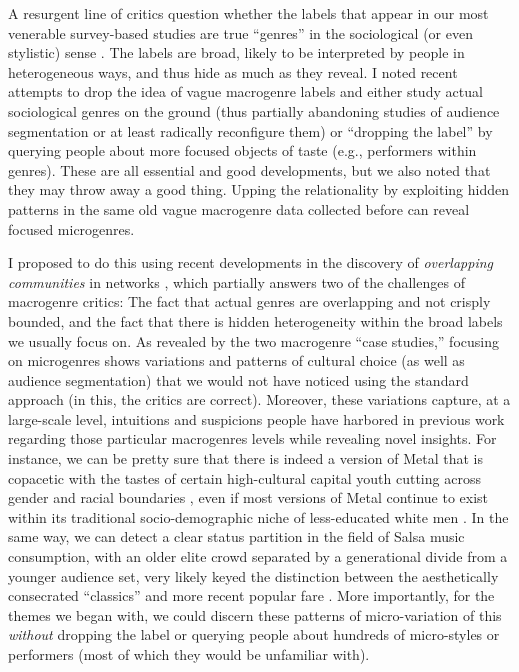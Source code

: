 \documentclass[a4paper,12pt]{article}
\begin{document}
A resurgent line of critics question whether the labels that appear in our most venerable survey-based studies are true ``genres'' in the sociological (or even stylistic) sense \citep{lena2015relational, vlegels2015music}. The labels are broad, likely to be interpreted by people in heterogeneous ways, and thus hide as much as they reveal. I noted recent attempts to drop the idea of vague macrogenre labels and either study actual sociological genres on the ground (thus partially abandoning studies of audience segmentation or at least radically reconfigure them) or ``dropping the label'' \citep{sonnett2016ambivalence} by querying people about more focused objects of taste (e.g., performers within genres). These are all essential and good developments, but we also noted that they may throw away a good thing. Upping the relationality by exploiting hidden patterns in the same old vague macrogenre data collected before can reveal focused microgenres. 

I proposed to do this using recent developments in the discovery of \textit{overlapping communities} in networks \citep{ahn_etal10}, which partially answers two of the challenges of macrogenre critics: The fact that actual genres are overlapping and not crisply bounded, and the fact that there is hidden heterogeneity within the broad labels we usually focus on. As revealed by the two macrogenre ``case studies,'' focusing on microgenres shows variations and patterns of cultural choice (as well as audience segmentation) that we would not have noticed using the standard approach (in this, the critics are correct). Moreover, these variations capture, at a large-scale level, intuitions and suspicions people have harbored in previous work regarding those particular macrogenres levels while revealing novel insights. For instance, we can be pretty sure that there is indeed a version of Metal that is copacetic with the tastes of certain high-cultural capital youth cutting across gender and racial boundaries \citep{tampubolon2008revisiting}, even if most versions of Metal continue to exist within its traditional socio-demographic niche of less-educated white men \citep{bryson96}. In the same way, we can detect a clear status partition in the field of Salsa music consumption, with an older elite crowd separated by a generational divide from a younger audience set, very likely keyed the distinction between the aesthetically consecrated ``classics'' and more recent popular fare \citep{Bachmayer2014-pk}. More importantly, for the themes we began with, we could discern these patterns of micro-variation of this \textit{without} dropping the label or querying people about hundreds of micro-styles or performers (most of which they would be unfamiliar with). 
\end{document}
